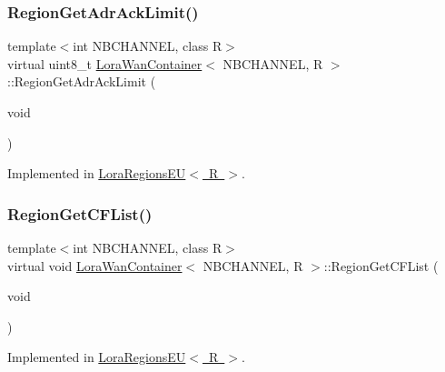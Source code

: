 \subsubsection{\texorpdfstring{Region\+Get\+Adr\+Ack\+Limit()}{RegionGetAdrAckLimit()}}
{\footnotesize\ttfamily template$<$int N\+B\+C\+H\+A\+N\+N\+EL, class R$>$ \\
virtual uint8\+\_\+t \mbox{\hyperlink{class_lora_wan_container}{Lora\+Wan\+Container}}$<$ N\+B\+C\+H\+A\+N\+N\+EL, R $>$\+::Region\+Get\+Adr\+Ack\+Limit (\begin{DoxyParamCaption}\item[{void}]{ }\end{DoxyParamCaption})\hspace{0.3cm}{\ttfamily [pure virtual]}}



Implemented in \mbox{\hyperlink{class_lora_regions_e_u_aed553b79468100fb271bb2ac6a230c58}{Lora\+Regions\+E\+U$<$ R $>$}}.

\mbox{\label{class_lora_wan_container_a6603ef368fea1cf2d1e4de2120c1dff6}} 
\subsubsection{\texorpdfstring{Region\+Get\+C\+F\+List()}{RegionGetCFList()}}
{\footnotesize\ttfamily template$<$int N\+B\+C\+H\+A\+N\+N\+EL, class R$>$ \\
virtual void \mbox{\hyperlink{class_lora_wan_container}{Lora\+Wan\+Container}}$<$ N\+B\+C\+H\+A\+N\+N\+EL, R $>$\+::Region\+Get\+C\+F\+List (\begin{DoxyParamCaption}\item[{void}]{ }\end{DoxyParamCaption})\hspace{0.3cm}{\ttfamily [pure virtual]}}



Implemented in \mbox{\hyperlink{class_lora_regions_e_u_acdbe1d2f767912fac7edf295961dfb6b}{Lora\+Regions\+E\+U$<$ R $>$}}.

\mbox{\label{class_lora_wan_container_a3ced7ed5217292b17d3f554fdc12c45e}} 
